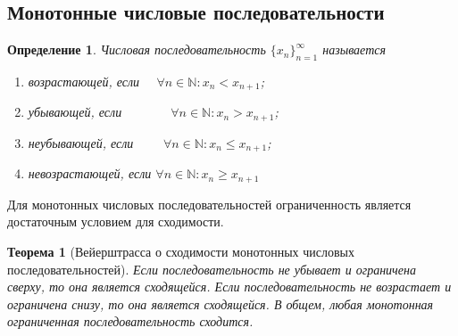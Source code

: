 \documentclass[a4paper,12pt]{article} %
\newtheorem{definition}{Определение}[section]
\newtheorem{theorem}{Теорема}[section]
\theoremstyle{remark}
\theoremstyle{definition}
\begin{document}
\subsection{Монотонные числовые последовательности}
\begin{definition}
	Числовая последовательность $\{x_n\}_{n=1}^{\infty}$ называется 
	\begin{enumerate}
		\item возрастающей, если \ \ $\forall n\in \mathbb{N}:x_{n}<x_{n+1}$;
		\item убывающей, если \ \ \ \ \ \ \ $\forall n\in \mathbb{N}:x_{n}>x_{n+1}$;
		\item неубывающей, если \ \ \ \ $\forall n\in \mathbb{N}:x_{n}\le  x_{n+1}$;
		\item невозрастающей, если $\forall n\in \mathbb{N}:x_{n}\ge x_{n+1}$
	\end{enumerate}
\end{definition}
Для монотонных числовых последовательностей ограниченность является достаточным условием для сходимости.
\begin{theorem}[Вейерштрасса о сходимости монотонных числовых последовательностей]
	Если последовательность не убывает и ограничена сверху, то она является сходящейся.
	Если последовательность не возрастает и ограничена снизу, то она является сходящейся. 
    В общем, любая монотонная ограниченная последовательность сходится.
\end{theorem}
\end{document}
